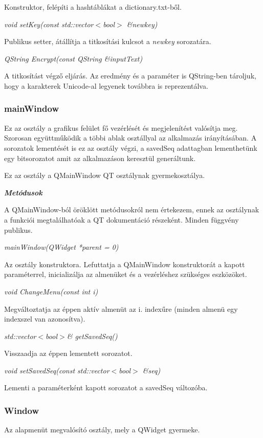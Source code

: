\documentclass[12pt]{article}
\begin{document}
Konstruktor, felépíti a hashtáblákat a dictionary.txt-ből.

\textit{void setKey(const std::vector$<$bool$>$ \&newkey)}

Publikus setter, átállítja a titkosítási kulcsot a \textit{newkey} sorozatára.

\textit{QString Encrypt(const QString \&inputText)}

A titkosítást végző eljárás. Az eredmény és a paraméter is QString-ben tároljuk, hogy a karakterek Unicode-al legyenek továbbra is reprezentálva.
\subsubsection*{mainWindow}
Ez az osztály a grafikus felület fő vezérlését és megjelenítést valósítja meg. Szorosan együttműködik a többi ablak osztállyal az alkalmazás irányításában. A sorozatok lementését is ez az osztály végzi, a savedSeq adattagban lementhetünk egy bitsorozatot amit az alkalmazáson keresztül generáltunk.

Ez az osztály a QMainWindow QT osztálynak gyermekosztálya.

\textit{\textbf{Metódusok}}

A QMainWindow-ból öröklött metódusokról nem értekezem, ennek az osztálynak a funkciói megtalálhatóak a QT dokumentáció részeként. Minden függvény publikus.

\textit{mainWindow(QWidget *parent = 0)}

Az osztály konstruktora. Lefuttatja a QMainWindow konstruktorát a kapott paraméterrel, inicializálja az almenüket és a vezérléshez szükséges eszközöket.

\textit{void ChangeMenu(const int i)}

Megváltoztatja az éppen aktív almenüt az i. indexűre (minden almenü egy indexszel van azonosítva).

\textit{std::vector$<$bool$>$\& getSavedSeq()}

Visszaadja az éppen lementett sorozatot.

\textit{void setSavedSeq(const std::vector$<$bool$>$ \&seq)}

Lementi a paraméterként kapott sorozatot a savedSeq változóba.

\subsubsection*{Window}
Az alapmenüt megvalósító osztály, mely a QWidget gyermeke.
\end{document}
